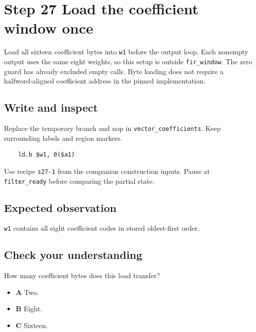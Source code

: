 \section{Step 27 Load the coefficient window once}\label{fir-s27}

Load all sixteen coefficient bytes into \texttt{w1} before the output loop. Each nonempty output uses the same eight weights, so this setup is outside \texttt{fir\_window}. The zero guard has already excluded empty calls. Byte loading does not require a halfword-aligned coefficient address in the pinned implementation.

\subsection{Write and inspect}
Replace the temporary branch and nop in \texttt{vector\_coefficients}. Keep surrounding labels and region markers.

\begin{verbatim}
    ld.b $w1, 0($a1)
\end{verbatim}
Use recipe \texttt{s27-1} from the companion construction inputs. Pause at \texttt{filter\_ready} before comparing the partial state.

\subsection{Expected observation}
\texttt{w1} contains all eight coefficient codes in stored oldest-first order.

\subsection{Check your understanding}
How many coefficient bytes does this load transfer?

\begin{itemize}
  \item \textbf{A} Two.
  \item \textbf{B} Eight.
  \item \textbf{C} Sixteen.
\end{itemize}

